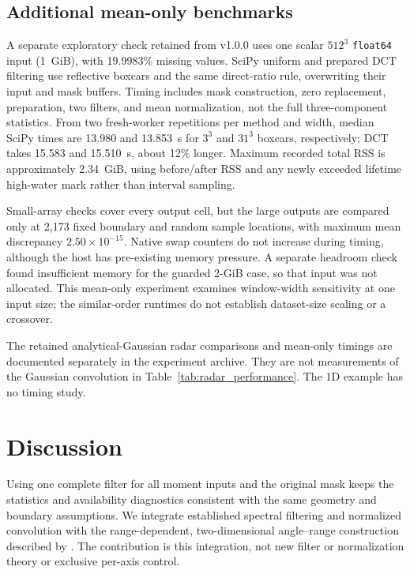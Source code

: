 \documentclass[a4paper,fleqn]{cas-sc}
\begin{document}
\FloatBarrier
\subsection{Additional mean-only benchmarks}

A separate exploratory check retained from v1.0.0 uses one scalar $512^3$ \texttt{float64} input (1~GiB), with 19.9983\% missing values. SciPy uniform and prepared DCT filtering use reflective boxcars and the same direct-ratio rule, overwriting their input and mask buffers. Timing includes mask construction, zero replacement, preparation, two filters, and mean normalization, not the full three-component statistics. From two fresh-worker repetitions per method and width, median SciPy times are 13.980 and 13.853~s for $3^3$ and $31^3$ boxcars, respectively; DCT takes 15.583 and 15.510~s, about 12\% longer. Maximum recorded total RSS is approximately 2.34~GiB, using before/after RSS and any newly exceeded lifetime high-water mark rather than interval sampling.

Small-array checks cover every output cell, but the large outputs are compared only at 2,173 fixed boundary and random sample locations, with maximum mean discrepancy $2.50\times10^{-15}$. Native swap counters do not increase during timing, although the host has pre-existing memory pressure. A separate headroom check found insufficient memory for the guarded 2-GiB case, so that input was not allocated. This mean-only experiment examines window-width sensitivity at one input size; the similar-order runtimes do not establish dataset-size scaling or a crossover.

The retained analytical-Gaussian radar comparisons and mean-only timings are documented separately in the experiment archive. They are not measurements of the Gaussian convolution in Table~\ref{tab:radar_performance}. The 1D example has no timing study.

\section{Discussion}
\label{sec:discussion}

Using one complete filter for all moment inputs and the original mask keeps the statistics and availability diagnostics consistent with the same geometry and boundary assumptions. We integrate established spectral filtering \citep{Oppenheim1999,Martucci1994} and normalized convolution \citep{Knutsson1993,Westin1994,Pham2006} with the range-dependent, two-dimensional angle--range construction described by \citet{Valdivia2026RadarDCT}. The contribution is this integration, not new filter or normalization theory or exclusive per-axis control.
\end{document}
